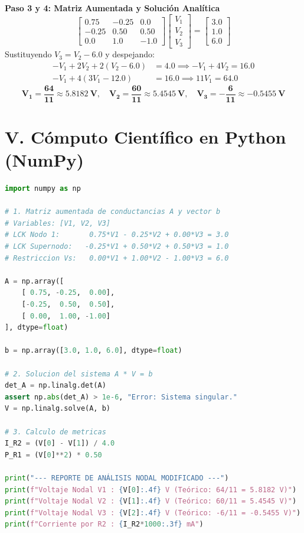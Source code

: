 \documentclass[11pt, a4paper]{article}
\begin{document}
\textbf{Paso 3 y 4: Matriz Aumentada y Solución Analítica}
\begin{equation*}
    \begin{bmatrix} 0.75 & -0.25 & 0.0 \\ -0.25 & 0.50 & 0.50 \\ 0.0 & 1.0 & -1.0 \end{bmatrix} \begin{bmatrix} V_1 \\ V_2 \\ V_3 \end{bmatrix} = \begin{bmatrix} 3.0 \\ 1.0 \\ 6.0 \end{bmatrix}
\end{equation*}
Sustituyendo $V_3 = V_2 - 6.0$ y despejando:
\begin{align*}
    -V_1 + 2 V_2 + 2(V_2 - 6.0) &= 4.0 \implies -V_1 + 4 V_2 = 16.0 \\
    -V_1 + 4(3 V_1 - 12.0) &= 16.0 \implies 11 V_1 = 64.0
\end{align*}
\begin{equation*}
    \mathbf{V_1 = \frac{64}{11} \approx \qty{5.8182}{\volt}}, \quad \mathbf{V_2 = \frac{60}{11} \approx \qty{5.4545}{\volt}}, \quad \mathbf{V_3 = -\frac{6}{11} \approx \qty{-0.5455}{\volt}}
\end{equation*}

\section{V. Cómputo Científico en Python (NumPy)}
\begin{lstlisting}[language=Python]
import numpy as np

# 1. Matriz aumentada de conductancias A y vector b
# Variables: [V1, V2, V3]
# LCK Nodo 1:       0.75*V1 - 0.25*V2 + 0.00*V3 = 3.0
# LCK Supernodo:   -0.25*V1 + 0.50*V2 + 0.50*V3 = 1.0
# Restriccion Vs:   0.00*V1 + 1.00*V2 - 1.00*V3 = 6.0

A = np.array([
    [ 0.75, -0.25,  0.00],
    [-0.25,  0.50,  0.50],
    [ 0.00,  1.00, -1.00]
], dtype=float)

b = np.array([3.0, 1.0, 6.0], dtype=float)

# 2. Solucion del sistema A * V = b
det_A = np.linalg.det(A)
assert np.abs(det_A) > 1e-6, "Error: Sistema singular."
V = np.linalg.solve(A, b)

# 3. Calculo de metricas
I_R2 = (V[0] - V[1]) / 4.0
P_R1 = (V[0]**2) * 0.50

print("--- REPORTE DE ANÁLISIS NODAL MODIFICADO ---")
print(f"Voltaje Nodal V1 : {V[0]:.4f} V (Teórico: 64/11 = 5.8182 V)")
print(f"Voltaje Nodal V2 : {V[1]:.4f} V (Teórico: 60/11 = 5.4545 V)")
print(f"Voltaje Nodal V3 : {V[2]:.4f} V (Teórico: -6/11 = -0.5455 V)")
print(f"Corriente por R2 : {I_R2*1000:.3f} mA")
\end{lstlisting}
\end{document}
